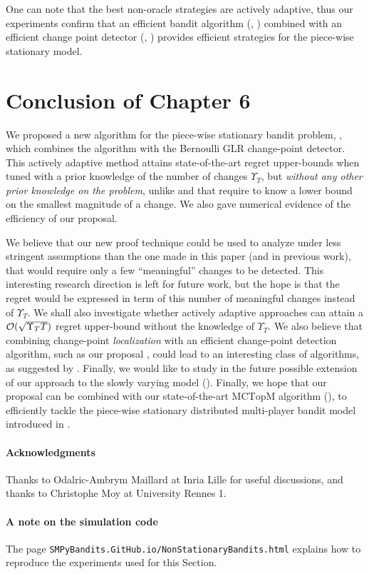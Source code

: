 One can note that the best non-oracle strategies are actively adaptive,
thus our experiments confirm that an efficient bandit algorithm (\eg, \klUCB) combined with an efficient change point detector (\eg, \GLR) provides efficient strategies for the piece-wise stationary model.


\section{Conclusion of Chapter 6}

We proposed a new algorithm for the piece-wise stationary bandit problem, \GLRklUCB, which combines the \klUCB{} algorithm with the Bernoulli GLR change-point detector. This actively adaptive method attains state-of-the-art regret upper-bounds when tuned with a prior knowledge of the number of changes $\Upsilon_T$, but \emph{without any other prior knowledge on the problem}, unlike \CUSUMUCB{} and \MUCB{} that require to know a lower bound on the smallest magnitude of a change. We also gave numerical evidence of the efficiency of our proposal.

We believe that our new proof technique could be used to analyze \GLRklUCB{} under less stringent assumptions than the one made in this paper (and in previous work), that would require only a few ``meaningful'' changes to be detected. This interesting research direction is left for future work,  but the hope is that the regret would be expressed in term of this number of meaningful changes instead of $\Upsilon_T$. We shall also investigate whether actively adaptive approaches can attain a $\mathcal{O}(\sqrt{\Upsilon_T T})$ regret upper-bound without the knowledge of $\Upsilon_T$.
We also believe that combining change-point \emph{localization} with an efficient change-point detection algorithm, such as our proposal \GLRklUCB, could lead to an interesting class of algorithms, as suggested by \cite{Maillard2018GLR}.
Finally, we would like to study in the future possible extension of our approach to the slowly varying model (\cite{WeiSrivastava18}).
Finally, we hope that our proposal can be combined with our state-of-the-art $\mathrm{MCTopM}$ algorithm (\cite{Besson2018ALT}), to efficiently tackle the piece-wise stationary distributed multi-player bandit model introduced in \cite{Wei2018}.


\paragraph{Acknowledgments}
Thanks to Odalric-Ambrym Maillard at Inria Lille for useful discussions, and thanks to Christophe Moy at University Rennes 1.

\paragraph{A note on the simulation code}
The page \texttt{SMPyBandits.GitHub.io/NonStationaryBandits.html} explains how to reproduce the experiments used for this Section.

% 
% 
